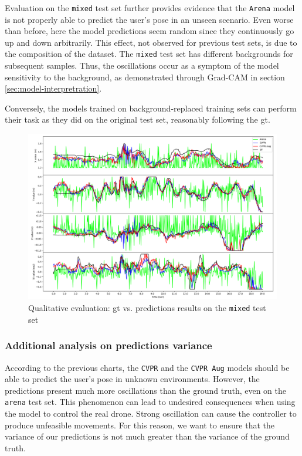 Evaluation on the \texttt{mixed} test set further provides evidence that the \texttt{Arena} model is not properly able to predict the user's pose in an unseen scenario. Even worse than before, here the model predictions seem random since they continuously go up and down arbitrarily. This effect, not observed for previous test sets, is due to the composition of the dataset. The \texttt{mixed} test set has different backgrounds for subsequent samples. Thus, the oscillations occur as a symptom of the model sensitivity to the background, as demonstrated through Grad-CAM in section \ref{sec:model-interpretration}.

Conversely, the models trained on background-replaced training sets can perform their task as they did on the original test set, reasonably following the \gls{gt}.

\begin{figure}[H]
	\centering
	\includegraphics[width=1 \textwidth]{"contents/images/06-gtpred-mixed"}
	\caption[Qualitative evaluation: \gls{gt} vs. predictions results on the \texttt{mixed} test set]{Qualitative evaluation: \gls{gt} vs. predictions results on the \texttt{mixed} test set}
	\label{fig:ql-gtpred-mixed}
\end{figure}


\subsubsection*{Additional analysis on predictions variance}

According to the previous charts, the \texttt{CVPR} and the \texttt{CVPR Aug} models should be able to predict the user's pose in unknown environments. However, the predictions present much more oscillations than the ground truth, even on the \texttt{arena} test set. This phenomenon can lead to undesired consequences when using the model to control the real drone. Strong oscillation can cause the controller to produce unfeasible movements. For this reason, we want to ensure that the variance of our predictions is not much greater than the variance of the ground truth.

